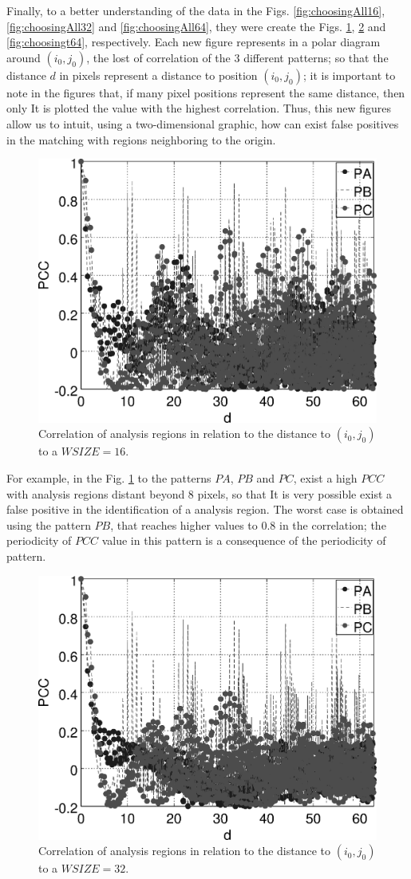 Finally, to a better understanding of the data in the Figs.
\ref{fig:choosingAll16}, \ref{fig:choosingAll32} and \ref{fig:choosingAll64},
they were create the Figs. 
\ref{fig:choosingt16}, \ref{fig:choosingt32} and \ref{fig:choosingt64},
 respectively.
Each new figure represents in a polar diagram around $(i_0,j_0)$, the lost of correlation
of the $3$ different patterns; so that the
distance $d$ in pixels represent a distance to position $(i_0,j_0)$; 
it is important to note in the figures that, if many pixel positions
represent the same distance, then only It is plotted the value with the highest correlation.
Thus, this new figures allow us to intuit, using a two-dimensional graphic,
how can exist false positives in the matching with regions neighboring to the origin.
\begin{figure}[H]
\centering
  \includegraphics[width=.55\columnwidth]{image_plot-16.eps}
  \caption{Correlation of analysis regions in relation to the distance to $(i_0,j_0)$ to a $WSIZE=16$.}
  \label{fig:choosingt16}
\end{figure}
For example, in the Fig. \ref{fig:choosingt16} to the patterns $PA$, $PB$ and $PC$,
exist a high $PCC$ with analysis regions distant beyond 8 pixels, so that
It is very possible exist a false positive in the identification of a analysis 
region. The worst case is  obtained using the pattern $PB$, that reaches higher values
to $0.8$ in the correlation; the periodicity of $PCC$ value in this pattern
is a consequence of the periodicity of pattern.
\begin{figure}[H]
\centering
  \includegraphics[width=.55\columnwidth]{image_plot-32.eps}
  \caption{Correlation of analysis regions in relation to the distance to $(i_0,j_0)$ to a $WSIZE=32$.}
  \label{fig:choosingt32}
\end{figure}
